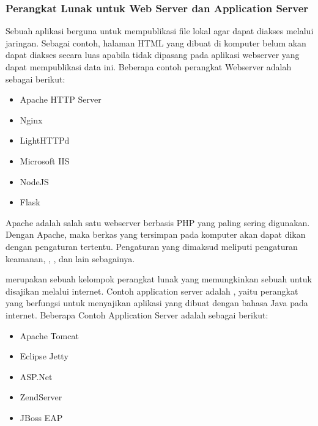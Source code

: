 \documentclass[letterpaper,10pt,english]{sphinxmanual}
\begin{document}
\subsubsection{Perangkat Lunak untuk Web Server dan Application Server}
\label{\detokenize{sesi1/linuxserver:perangkat-lunak-untuk-web-server-dan-application-server}}
Sebuah aplikasi  berguna untuk mempublikasi file lokal agar dapat diakses melalui jaringan. Sebagai contoh, halaman HTML yang dibuat di komputer belum akan dapat diakses secara luas apabila tidak dipasang pada aplikasi webserver yang dapat mempublikasi data ini. Beberapa contoh perangkat Webserver adalah sebagai berikut:
\begin{itemize}
\item {} 
Apache HTTP Server

\item {} 
Nginx

\item {} 
LightHTTPd

\item {} 
Microsoft IIS

\item {} 
NodeJS

\item {} 
Flask

\end{itemize}

Apache adalah salah satu webserver berbasis PHP yang paling sering digunakan. Dengan Apache, maka berkas yang tersimpan pada komputer akan dapat dikan dengan pengaturan tertentu. Pengaturan yang dimaksud meliputi pengaturan keamanan, , , dan lain sebagainya.

 merupakan sebuah kelompok  perangkat lunak yang memungkinkan sebuah  untuk disajikan melalui internet. Contoh application server adalah , yaitu perangkat yang berfungsi untuk menyajikan aplikasi yang dibuat dengan bahasa Java pada internet. Beberapa Contoh Application Server adalah sebagai berikut:
\begin{itemize}
\item {} 
Apache Tomcat

\item {} 
Eclipse Jetty

\item {} 
ASP.Net

\item {} 
ZendServer

\item {} 
JBoss EAP

\end{itemize}
\end{document}
